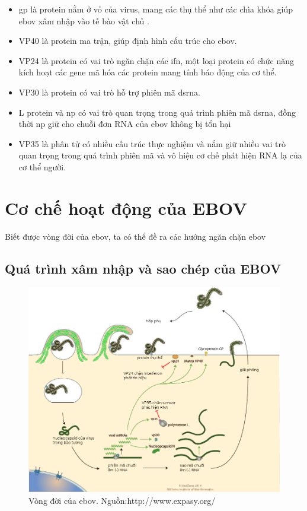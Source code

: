 \documentclass[12pt,a4paper,reqno, oneside]{book}
\begin{document}
	\begin{itemize}
	\item \gls{gp} là protein nằm ở vỏ của virus, mang các thụ thể như các chìa khóa giúp \gls{ebov} xâm nhập vào tế bào vật chủ \cite{Johnson2006, Lee2009}.
	\item VP40 là protein ma trận, giúp định hình cấu trúc cho \gls{ebov}\cite{Dessen2000, Noda2002}.
	\item VP24 là protein có vai trò ngăn chặn các \gls{ifn}, một loại protein có chức năng kích hoạt các gene mã hóa các protein mang tính báo động của cơ thể\cite{Reid2006}.
	\item VP30 là protein có vai trò hỗ trợ phiên mã \gls{dsrna}\cite{Weik2002}.
	\item L protein và \gls{np}\cite{Feldmann2003,Dziubanska:be5269} có vai trò quan trọng trong quá trình phiên mã \gls{dsrna}, đồng thời \gls{np} giữ cho chuỗi đơn RNA của \gls{ebov} không bị tổn hại\cite{Dziubanska:be5269}
	\item VP35 là phân tử có nhiều cấu trúc thực nghiệm và nắm giữ nhiều vai trò quan trọng trong quá trình phiên mã và vô hiệu cơ chế phát hiện RNA lạ của cơ thể người\cite{Muhlberger1999,Basler2000,Basler2003,Enterlein2006,Feng2007,Prins2009}.
	\end{itemize}

\section{Cơ chế hoạt động của EBOV}
Biết được vòng đời của \gls{ebov}, ta có thể đề ra các hướng ngăn chặn \gls{ebov}
\subsection{Quá trình xâm nhập và sao chép của EBOV}
		\begin{figure}[t!]
		\centering
		\includegraphics[width=1.0\textwidth,natwidth=610,natheight=642]{Ebolavirus_cycle.png}
		\caption{Vòng đời của \gls{ebov}. Nguồn:http://www.expasy.org/}
		\label{fig:viruscycle}
		\end{figure}
\end{document}
